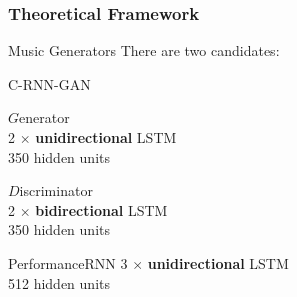 \documentclass{beamer}
\begin{document}
\begin{frame}
    \frametitle{Theoretical Framework}
    \begin{block}{Music Generators}
        There are two candidates:
    \end{block}
        \begin{block}{C-RNN-GAN}
            \begin{minipage}[b]{0.48\textwidth}
                $G$enerator \\
                2 $\times$ \textbf{unidirectional} LSTM \\
                350 hidden units
            \end{minipage}
            \hfill
            \begin{minipage}[b]{0.48\textwidth}
                $D$iscriminator \\
                2 $\times$ \textbf{bidirectional} LSTM \\
                350 hidden units
            \end{minipage}
        \end{block}
        \begin{block}{PerformanceRNN}
            3 $\times$ \textbf{unidirectional} LSTM \\
            512 hidden units
        \end{block}
\end{frame}
\end{document}
